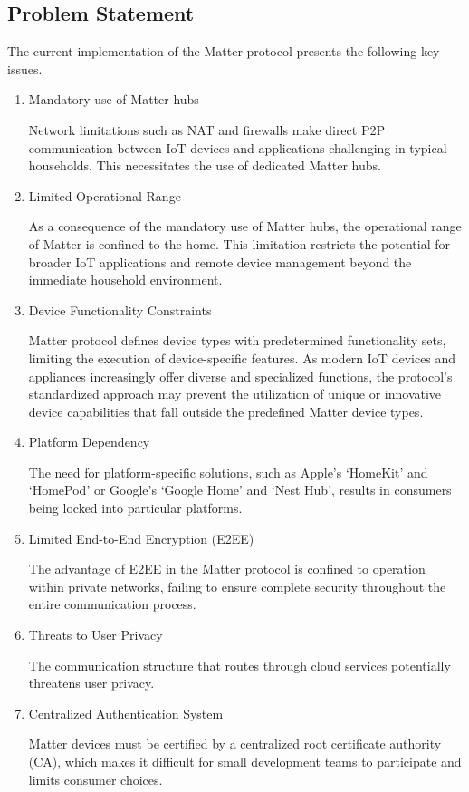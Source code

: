 \documentclass[conference]{IEEEtran}
\begin{document}
\subsection{Problem Statement}
The current implementation of the Matter protocol presents the following key
issues.
\begin{enumerate}[itemsep=2ex, parsep=1ex]
	\item Mandatory use of Matter hubs
	      	      
	      Network limitations such as NAT and firewalls make direct P2P
	      communication between IoT devices and applications challenging in typical
	      households. This necessitates the use of dedicated Matter hubs.
	      	      
	\item Limited Operational Range
	      	      
	      As a consequence of the mandatory use of Matter hubs, the operational range
	      of Matter is confined to the home. This limitation restricts the potential
	      for broader IoT applications and remote device management beyond the
	      immediate household environment.
	      	      
	\item Device Functionality Constraints
	      	                  
	      Matter protocol defines device types with predetermined functionality sets, limiting the execution of device-specific features. As modern IoT devices and appliances increasingly offer diverse and specialized functions, the protocol's standardized approach may prevent the utilization of unique or innovative device capabilities that fall outside the predefined Matter device types.
	      	      
	\item Platform Dependency
	      	      
	      The need for platform-specific solutions, such as Apple's `HomeKit' and `HomePod'
	      or Google's `Google Home' and `Nest Hub', results in consumers being
	      locked into particular platforms.
	      	      
	\item Limited End-to-End Encryption (E2EE)
	      	      
	      The advantage of E2EE in the Matter protocol is confined to operation
	      within private networks, failing to ensure complete security throughout the
	      entire communication process.
	      	      
	\item Threats to User Privacy
	      	      
	      The communication structure that routes through cloud services potentially
	      threatens user privacy.
	      	      
	\item Centralized Authentication System
	      	      
	      Matter devices must be certified by a centralized root certificate
	      authority (CA), which makes it difficult for small development teams to participate
	      and limits consumer choices.
\end{enumerate}
\end{document}
